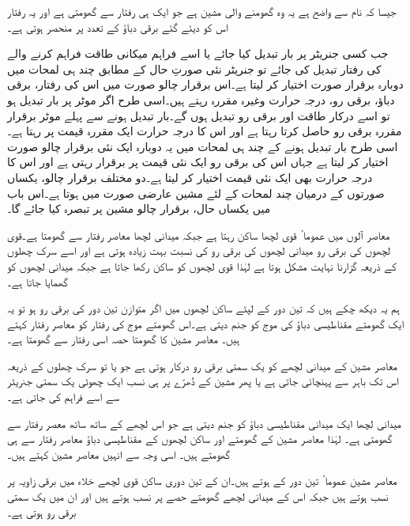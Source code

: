 جیسا کہ نام سے واضح ہے یہ وہ گھومنے والی مشین ہے جو ایک ہی رفتار سے گھومتی ہے اور یہ رفتار اس کو دیئے گئے برقی دباؤ کے تعدد پر منحصر ہوتی ہے۔

جب کسی جنریٹر پر بار تبدیل کیا جائے یا اسے فراہم میکانی طاقت فراہم کرنے والے کی رفتار تبدیل کی جائے تو جنریٹر نئی صورتِ حال کے  مطابق چند ہی لمحات میں دوبارہ برقرار  صورت اختیار کر لیتا ہے۔اس برقرار چالو صورت میں اس کی رفتار، برقی دباؤ، برقی رو، درجہ حرارت وغیرہ  مقررہ رہتے ہیں۔اسی طرح اگر موٹر پر بار تبدیل ہو تو اسے درکار طاقت اور برقی رو تبدیل ہوں گے۔بار تبدیل ہونے سے پہلے موٹر برقرار مقررہ برقی رو حاصل کرتا رہتا ہے اور اس کا درجہ حرارت ایک مقررہ قیمت پر رہتا ہے۔اسی طرح بار تبدیل ہونے کے چند ہی لمحات میں یہ دوبارہ ایک نئی برقرار چالو صورت اختیار کر لیتا ہے جہاں اس کی برقی رو ایک نئی قیمت پر برقرار رہتی ہے اور اس کا درجہ حرارت بھی ایک نئی قیمت اختیار کر لیتا ہے۔دو مختلف برقرار چالو، یکساں صورتوں کے درمیان چند لمحات کے لئے مشین عارضی صورت میں ہوتا ہے۔اس باب میں یکساں حال، برقرار چالو مشین پر تبصرہ کیا جائے گا۔ 

معاصر آلوں میں عموما ً قوی لچھا ساکن رہتا ہے جبکہ میدانی لچھا معاصر رفتار سے گھومتا ہے۔قوی لچھوں کی برقی رو میدانی لچھوں کی برقی رو کی نسبت بہت زیادہ ہوتی ہے اور اسے سرک چھلوں کے ذریعہ گزارنا نہایت مشکل ہوتا ہے لہٰذا قوی لچھوں کو ساکن رکھا جاتا ہے جبکہ میدانی لچھوں کو گھمایا جاتا ہے۔

 ہم یہ دیکھ چکے ہیں کہ تین دور کے لپٹے ساکن لچھوں میں اگر متوازن تین دور کی برقی رو ہو تو یہ ایک گھومتے مقناطیسی دباؤ کی موج کو جنم دیتی ہے۔اس گھومتے موج کی رفتار کو معاصر رفتار  کہتے ہیں۔ معاصر مشین کا گھومتا حصہ اسی رفتار سے گھومتا ہے۔ 

معاصر مشین کے میدانی لچھے کو یک سمتی برقی رو درکار ہوتی ہے جو یا تو سرک چھلوں کے ذریعہ اس تک باہر سے پہنچائی جاتی ہے یا پھر مشین کے دُھرّے پر ہی نسب ایک چھوٹی یک سمتی جنریٹر سے اسے فراہم کی جاتی ہے۔

میدانی لچھا ایک میدانی مقناطیسی دباؤ کو جنم دیتی ہے جو اس لچھے کے ساتھ ساتھ معصر رفتار سے گھومتی ہے۔ لہٰذا معاصر مشین کے گھومتے اور ساکن لچھوں کے مقناطیسی دباؤ معاصر رفتار سے ہی گھومتے ہیں۔ اسی وجہ سے انہیں معاصر مشین کہتے ہیں۔

معاصر مشین عموما ً تین دور کے ہوتے ہیں۔ان کے تین دوری ساکن قوی لچھے خلاء میں   برقی زاویہ پر نسب ہوتے ہیں جبکہ اس کے میدانی لچھے گھومتے حصے پر نسب ہوتے ہیں اور ان میں یک سمتی برقی رو ہوتی ہے۔ 

